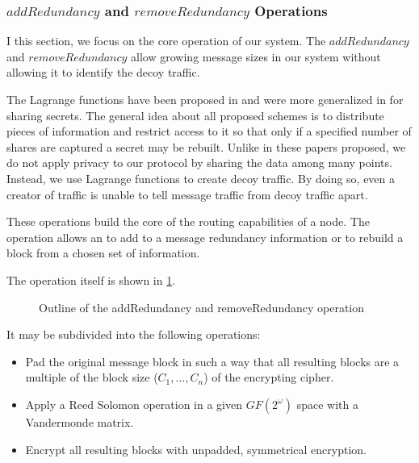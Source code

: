 \subsubsection{\texorpdfstring{$addRedundancy$}{addRedundancy} and \texorpdfstring{$removeRedundancy$}{removeRedundancy} Operations}\label{sec:redundancyOperation}
I this section, we focus on the core operation of our system. The $addRedundancy$ and $removeRedundancy$ allow growing message sizes in our system without allowing it to identify the decoy traffic. 

The Lagrange functions have been proposed in \cite{shamir1979share} and were more generalized in \cite{mceliece1981sharing} for sharing secrets. The general idea about all proposed schemes is to distribute pieces of information and restrict access to it so that only if a specified number of shares are captured a secret may be rebuilt. Unlike in these papers proposed, we do not apply privacy to our protocol by sharing the data among many points. Instead, we use Lagrange functions to create decoy traffic. By doing so, even a creator of traffic is unable to tell message traffic from decoy traffic apart. 

These operations build the core of the routing capabilities of a node. The operation allows an  to add to a message redundancy information or to rebuild a block from a chosen set of information. 

The operation itself is shown in \cref{fig:addRedundancyOperation}. 

\begin{figure}[ht]\centering
	\resizebox{0.48\textwidth}{!}{}
	\resizebox{0.45\textwidth}{!}{}
	\caption{Outline of the addRedundancy and removeRedundancy operation}
	\label{fig:addRedundancyOperation}
\end{figure}

It may be subdivided into the following operations:
\begin{itemize}
	\item Pad the original message block in such a way that all resulting blocks are a multiple of the block size ($C_1,\ldots, C_n$) of the encrypting cipher.
	\item Apply a Reed Solomon operation in a given $GF(2^\omega)$ space with a Vandermonde matrix.
	\item Encrypt all resulting blocks with unpadded, symmetrical encryption.
\end{itemize}

